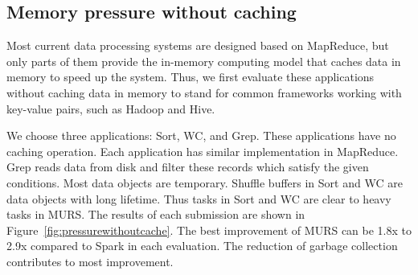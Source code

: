 \subsection{Memory pressure without caching}

Most current data processing systems are designed based on MapReduce, but only parts of them provide the in-memory computing model that caches data in memory to speed up the system. Thus, we first evaluate these applications without caching data in memory to stand for common frameworks working with key-value pairs, such as Hadoop and Hive.

We choose three applications: Sort, WC, and Grep. These applications have no caching operation. Each application has similar implementation in MapReduce. Grep reads data from disk and filter these records which satisfy the given conditions. Most data objects are temporary. Shuffle buffers in Sort and WC are data objects with long lifetime. Thus tasks in Sort and WC are clear to heavy tasks in MURS. The results of each submission are shown in Figure~\ref{fig:pressurewithoutcache}. The best improvement of MURS can be 1.8x to 2.9x compared to Spark in each evaluation. The reduction of garbage collection contributes to most improvement.

\begin{figure*}[!t]
\centering
{}
\caption{Results of memory pressure without caching}
\label{fig:pressurewithoutcache}
\end{figure*}

